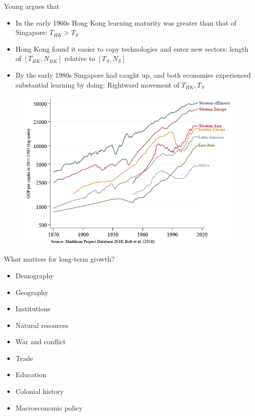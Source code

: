 \documentclass{beamer}
\begin{document}
\begin{frame}
  Young argues that
\begin{itemize}
  \item In the early 1960s Hong Kong learning maturity was greater than that of Singapore: $T_{HK}>T_S$
  \item Hong Kong found it easier to copy technologies and enter new sectors: length of $[T_{HK},N_{HK}]$ relative to $[T_{S},N_{S}]$
  \item By the early 1980s Singapore had caught up, and both economies experienced substantial learning by doing: Rightward movement of $T_{HK},T_S$  
\end{itemize}
\end{frame}

\begin{frame}
  \begin{figure}
    \includegraphics[scale=1.2]{bolt_et_al.eps}
  \end{figure}  
\end{frame}

\begin{frame}
  What matters for long-term growth?
  \begin{itemize}
    \item Demography
    \item Geography
    \item Institutions
    \item Natural resources
    \item War and conflict
    \item Trade
    \item Education
    \item Colonial history
    \item Macroeconomic policy
  \end{itemize}
\end{frame}
\end{document}
